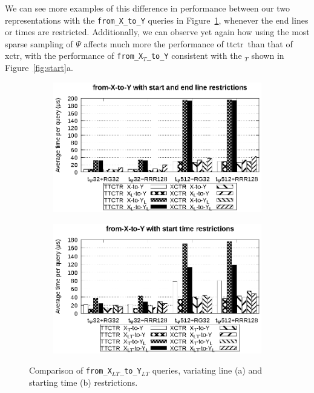     \medskip
    We can see more examples of this difference in performance between our two representations with the \texttt{from\_X\_to\_Y} queries in Figure~\ref{fig:xy0}, whenever the end lines or times are restricted. Additionally, we can observe yet again how using the most sparse sampling of $\Psi$ affects much more the performance of \gls{ttctr}~than that of \gls{xctr}, with the performance of \texttt{from\_X$_{T}$\_to\_Y} consistent with the \texttt{\startX$_T$} shown in Figure~\ref{fig:start}a.
    
    \begin{figure}[ht]
    \begin{subfigure}{0.5\linewidth}
    \includegraphics[width=\linewidth]{experiments/xy0.eps}
    \vspace{-12pt}
    \caption{}
    \vspace{-12pt}
    \end{subfigure}%
    \begin{subfigure}{0.5\linewidth}
    \includegraphics[width=\linewidth]{experiments/xy1.eps}
    \vspace{-12pt}
    \caption{}
    \vspace{-12pt}
    \end{subfigure}
    \caption{Comparison of \texttt{from\_X$_{LT}$\_to\_Y$_{LT}$} queries, variating line (a) and starting time (b) restrictions.}
    \label{fig:xy0}
    \end{figure}
    
